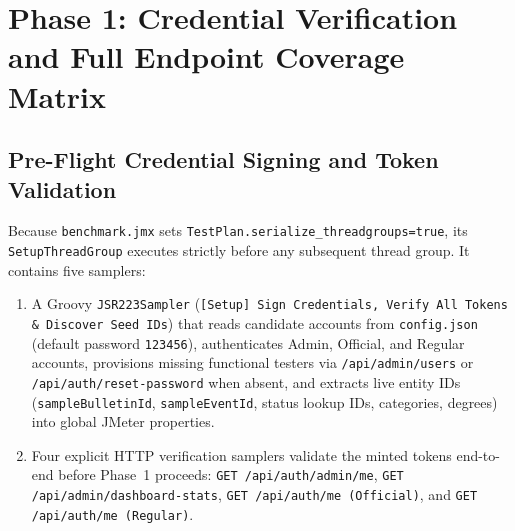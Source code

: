\documentclass[11pt,letterpaper]{article}
\begin{document}
\section{Phase 1: Credential Verification and Full Endpoint Coverage Matrix}

\subsection{Pre-Flight Credential Signing and Token Validation}
Because \texttt{benchmark.jmx} sets \texttt{TestPlan.serialize\_threadgroups=true}, its \texttt{SetupThreadGroup} executes strictly before any subsequent thread group. It contains five samplers:
\begin{enumerate}
  \item A Groovy \texttt{JSR223Sampler} (\texttt{[Setup] Sign Credentials, Verify All Tokens \& Discover Seed IDs}) that reads candidate accounts from \texttt{config.json} (default password \texttt{123456}), authenticates Admin, Official, and Regular accounts, provisions missing functional testers via \texttt{/api/admin/users} or \texttt{/api/auth/reset-password} when absent, and extracts live entity IDs (\texttt{sampleBulletinId}, \texttt{sampleEventId}, status lookup IDs, categories, degrees) into global JMeter properties.
  \item Four explicit HTTP verification samplers validate the minted tokens end-to-end before Phase~1 proceeds: \texttt{GET /\allowbreak api/\allowbreak auth/\allowbreak admin/\allowbreak me}, \texttt{GET /\allowbreak api/\allowbreak admin/\allowbreak dashboard-stats}, \texttt{GET /\allowbreak api/\allowbreak auth/\allowbreak me (Official)}, and \texttt{GET /\allowbreak api/\allowbreak auth/\allowbreak me (Regular)}.
\end{enumerate}
\end{document}

